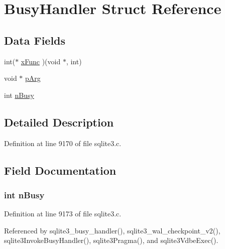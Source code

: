 \hypertarget{struct_busy_handler}{}\section{Busy\+Handler Struct Reference}
\label{struct_busy_handler}
\subsection*{Data Fields}
\begin{DoxyCompactItemize}
\item 
int($\ast$ \hyperlink{struct_busy_handler_a7e6c9383b6894eb86ebaa85cdaa4c5fc}{x\+Func} )(void $\ast$, int)
\item 
void $\ast$ \hyperlink{struct_busy_handler_a5a7d47e76f80bf2a08cba5fe83b61d2a}{p\+Arg}
\item 
int \hyperlink{struct_busy_handler_a2cba59936a825442eb10b9ffd786459c}{n\+Busy}
\end{DoxyCompactItemize}


\subsection{Detailed Description}


Definition at line 9170 of file sqlite3.\+c.



\subsection{Field Documentation}
\hypertarget{struct_busy_handler_a2cba59936a825442eb10b9ffd786459c}{}
\subsubsection[{n\+Busy}]{\setlength{\rightskip}{0pt plus 5cm}int n\+Busy}\label{struct_busy_handler_a2cba59936a825442eb10b9ffd786459c}


Definition at line 9173 of file sqlite3.\+c.



Referenced by sqlite3\+\_\+busy\+\_\+handler(), sqlite3\+\_\+wal\+\_\+checkpoint\+\_\+v2(), sqlite3\+Invoke\+Busy\+Handler(), sqlite3\+Pragma(), and sqlite3\+Vdbe\+Exec().

\hypertarget{struct_busy_handler_a5a7d47e76f80bf2a08cba5fe83b61d2a}{}
